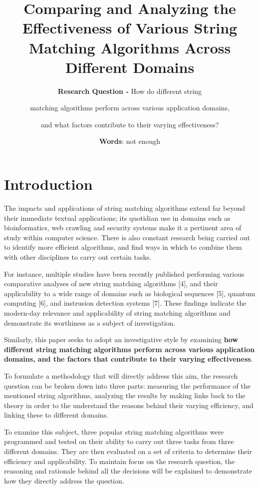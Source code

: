 \documentclass[12pt]{article}
\title{\textbf{Comparing and Analyzing the Effectiveness of Various String Matching Algorithms Across Different Domains}} %
\author{\textbf{Research Question -} How do different string \and matching algorithms perform across various application domains, \and and what factors contribute to their varying effectiveness?} %
\date{\textbf{Words}: not enough} %
\begin{document}
\doublespacing

\maketitle %
\thispagestyle{empty}
\pagebreak
\tableofcontents
\thispagestyle{empty}

\clearpage
{}

\pagebreak
\section{Introduction} %

The impacts and applications of string matching algorithms extend far beyond their immediate textual applications; its quotidian use in domains such as bioinformatics, web crawling and security systems make it a pertinent area of study within computer science. There is also constant research being carried out to identify more efficient algorithms, and find ways in which to combine them with other disciplines to carry out certain tasks.

For instance, multiple studies have been recently published performing various comparative analyses of new string matching algorithms [4], and their applicability to a wide range of domains such as biological sequences [5], quantum computing [6], and instrusion detection systems [7]. These findings indicate the modern-day relevance and applicability of string matching algorithms and demonstrate its worthiness as a subject of investigation.

Similarly, this paper seeks to adopt an investigative style by examining \textbf{how different string matching algorithms perform across various application domains, and the factors that contribute to their varying effectiveness}. 

To formulate a methodology that will directly address this aim, the research question can be broken down into three parts: measuring the performance of the mentioned string algorithms, analyzing the results by making links back to the theory in order to the understand the reasons behind their varying efficiency, and linking these to different domains.

To examine this subject, three popular string matching algorithms were programmed and tested on their ability to carry out three tasks from three different domains. They are then evaluated on a set of criteria to determine their efficiency and applicability. To maintain focus on the research question, the reasoning and rationale behind all the decisions will be explained to demonstrate how they directly address the question.
\end{document}
